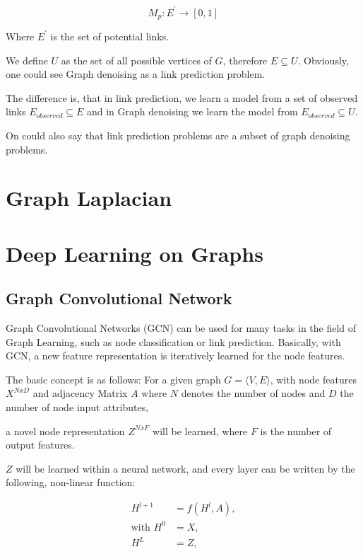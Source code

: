 \begin{equation}
    M_p : E^{\prime} \rightarrow [0,1]
\end{equation}

Where $E^{\prime}$ is the set of potential links.


We define $U$ as the set of all possible vertices of $G$, therefore $E \subseteq U$.
Obviously, one could see Graph denoising as a link prediction problem.

The difference is, that in link prediction, we learn a model from a set of observed links 
$E_{observed} \subseteq E$ and in Graph denoising we learn the model from 
$E_{observed} \subseteq U$. 

On could also say that link prediction problems are a subset of graph denoising problems.


\section{Graph Laplacian}

\section{Deep Learning on Graphs}

\subsection{Graph Convolutional Network}
Graph Convolutional Networks (GCN) \cite{GCN} can be used for many tasks in the field 
of Graph Learning, such as node classification or link prediction. 
Basically, with GCN, a new feature representation is iteratively learned for the node features.

The basic concept is as follows:
For a given graph $G = \langle V,E \rangle$, with node features $X^{N x D}$ and adjacency Matrix $A$
where $N$ denotes the number of nodes and $D$ the number of node input attributes,

a novel node representation $Z^{N x F}$ will be learned, where $F$ is the number of output features.

$Z$ will be learned within a neural network, and every layer can be written by the following, non-linear function:

\begin{equation}
    \begin{aligned}
        H^{l + 1} &= f( H^l, A), \\
        \text{with } H^0 &= X , \\
        H^L &= Z, 
    \end{aligned}
\end{equation}

